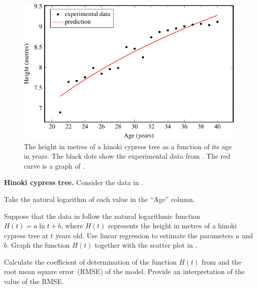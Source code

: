\documentclass[a4paper,oneside,12pt]{article}
\begin{document}
\begin{figure}[!htbp]
\centering
\includegraphics[scale=1.1]{image/12/hinoki-cypress.pdf}
\caption{%
  The height in metres of a hinoki cypress tree as a function of its
  age in years.  The black dots show the experimental data from
  .  The red curve is a graph of
  .
}
\label{fig:logarithm:hinoki_cypress_prediction}
\end{figure}

\begin{example}
\label{eg:logarithm:hinoki_cypress_tree}
\textbf{Hinoki cypress tree.}
Consider the data in .
\begin{packedenum}
\item\label{subex:logarithm:hinoki_cypress_log_transformation}
  Take the natural logarithm of each value in the ``Age'' column.

\item\label{subex:logarithm:hinoki_cypress_log_regression}
  Suppose that the data in  follow
  the natural logarithmic function $H(t) = a \ln t + b$, where $H(t)$
  represents the height in metres of a hinoki cypress tree at $t$
  years old.  Use linear regression to estimate the parameters $a$ and
  $b$.  Graph the function $H(t)$ together with the scatter plot in
  .

\item\label{subex:logarithm:hinoki_cypress_correlation_r_RMS_error}
  Calculate the coefficient of determination of the function $H(t)$
  from  and the
  root mean square error~(RMSE) of the model.  Provide an
  interpretation of the value of the RMSE.
\end{packedenum}
\end{example}
\end{document}
